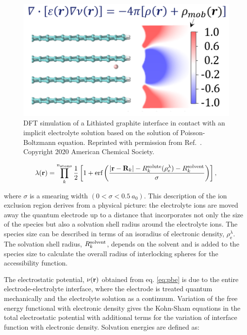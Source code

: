 \documentclass[../main.tex]{subfiles}
\begin{document}
\begin{figure}
    \centering
    \includegraphics[scale=0.7]{figures/DFT+Continuum.png}
    \caption{DFT simulation of a Lithiated graphite interface in contact with an implicit electrolyte solution based on the solution of Poisson-Boltzmann equation. Reprinted with permission from Ref.~. Copyright 2020 American Chemical Society.}
    \label{fig:DFT+continuum}
\end{figure}

\begin{equation}
    \label{eq:access}
    \lambda\!\left(\mathbf{r}\right) = \prod\limits_{k}^{n_\textrm{atoms}}\frac{1}{2} \left[1+\textrm{erf}\left(\frac{|\textbf{r}-\textbf{R}_k|-R^{\rm solute}_k(\rho_{\textrm{e}}^\lambda)-R^{\rm solvent}_k}{\sigma}\right)\right],
\end{equation}

where $\sigma$ is a smearing width $(0<\sigma<0.5~a_0)$. This description of the ion exclusion region derives from a physical picture: the electrolyte ions are moved away the quantum electrode up to a distance that incorporates not only the size of the species but also a solvation shell radius around the electrolyte ions. The species size can be described in terms of an isoradius of electronic density, $\rho_{\textrm{e}}^\lambda$. The solvation shell radius, $R^{\rm solvent}_k$, depends on the solvent and is added to the species size to calculate the overall radius of interlocking spheres for the accessibility function.

The electrostatic potential, $\nu\!\left(\mathbf{r}\right)$ obtained from eq. \ref{eq:pbe} is due to the entire electrode-electrolyte interface, where the electrode is treated quantum mechanically and the electrolyte solution as a continuum. Variation of the free energy functional with electronic density gives the Kohn-Sham equations in the total electrostatic potential with additional terms for the variation of interface function with electronic density.\cite{Dziedzic2011, Ringe2016} Solvation energies are defined as:\cite{Ringe2016, Stein2019}
\end{document}
